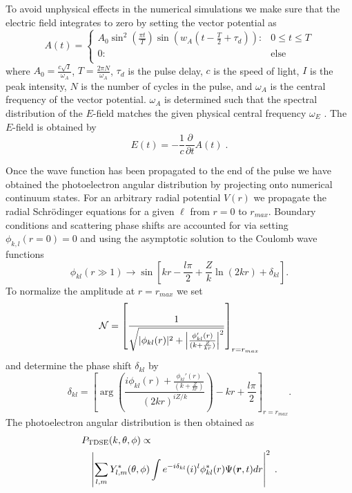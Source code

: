 To avoid unphysical effects in the numerical simulations we make sure that the electric field integrates to zero by setting the vector potential as \cite{chelkowski2002}
%
\begin{equation}
A(t) = \begin{cases} 
      A_0 \sin^2\left(\frac{\pi t}{T}\right)\sin(w_A(t-\frac{T}{2}+\tau_d)): & 0\leq t \leq T \\
      0: & \mbox{else} \\
   \end{cases} 
\end{equation}
%
where $A_0 = \frac{c\sqrt{I}}{\omega_A}$, $T = \frac{2\pi N}{\omega_A}$, $\tau_d$ is the pulse delay, $c$ is the speed of light, $I$ is the peak intensity, $N$ is the number of cycles in the pulse, and $\omega_A$ is the central frequency of the vector potential. $\omega_A$ is determined such that the spectral distribution of the $E$-field matches the given physical central frequency $\omega_E$ \cite{venzke2018_Central}. The $E$-field is obtained by
%
\begin{equation}
    E(t) = -\frac{1}{c}\frac{\partial}{\partial t}A(t)\; .
\end{equation}

Once the wave function has been propagated to the end of the pulse we have obtained the photoelectron angular distribution  by projecting onto numerical continuum states. For an arbitrary radial potential $V(r)$ we propagate the radial Schr\"odinger equations for a given $\ell$ from $r=0$ to $r_{max}$. Boundary conditions and scattering phase shifts are accounted for via setting $\phi_{k,l}(r=0)=0$ and using the asymptotic solution to the Coulomb wave functions
%
\begin{equation}
	\phi_{kl}(r\gg1) \rightarrow \sin\left[kr - \frac{l\pi}{2} +\frac{Z}{k} \ln(2kr) + \delta_{kl} \right].
\end{equation}
%
To normalize the amplitude at $r = r_{max}$ we set
%
\begin{equation}
	{\cal N} = \left[\frac{1}{\sqrt{|\phi_{kl}(r)|^2 + \left|\frac{\phi_{kl}'(r)}{(k+\frac{Z}{kr})}\right|^2}} \right]_{r=r_{max}}
\end{equation}
%
and determine the phase shift $\delta_{kl}$ by
%
\begin{equation}
    \delta_{kl} = \left[\arg\left(\frac{i\phi_{kl}(r) + \frac{\phi_{kl}'(r)}{(k+\frac{Z}{kr})} }{(2kr)^{iZ/k}}\right) - kr + \frac{l\pi}{2} \right]_{r=r_{max}}.
\end{equation}
%
The photoelectron angular distribution is then obtained as
%
\begin{eqnarray}
\lefteqn{P_{\text{TDSE}}(k,\theta,\phi) \propto}
    \\
    &&
    \left|\sum_{l,m} Y^*_{l,m}(\theta,\phi)\int  e^{-i\delta_{kl}}(i)^l \phi_{kl}^*(r) \Psi({\bm r},t) dr \right|^2 \; .
    \nonumber
\end{eqnarray}

